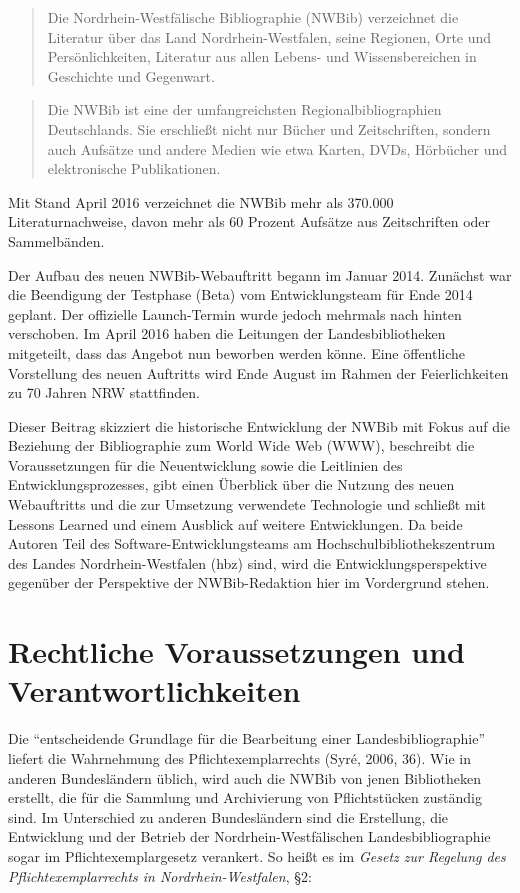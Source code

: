 \documentclass[a4paper,
fontsize=11pt,
oneside,
numbers=noperiodatend,
parskip=half-,
bibliography=totoc,
final
]{scrartcl}
\begin{document}
\begin{quote}
Die Nordrhein-Westfälische Bibliographie (NWBib) verzeichnet die
Literatur über das Land Nordrhein-West\-falen, seine Regionen, Orte und
Persönlichkeiten, Literatur aus allen Lebens- und Wissensbereichen in
Geschichte und Gegenwart.
\end{quote}

\begin{quote}
Die NWBib ist eine der umfangreichsten Regionalbibliographien
Deutschlands. Sie erschließt nicht nur Bücher und Zeitschriften, sondern
auch Aufsätze und andere Medien wie etwa Karten, DVDs, Hörbücher und
elektronische Publikationen.
\end{quote}

Mit Stand April 2016 verzeichnet die NWBib mehr als 370.000
Literaturnachweise, davon mehr als 60 Prozent Aufsätze aus Zeitschriften
oder Sammelbänden.

Der Aufbau des neuen NWBib-Webauftritt begann im Januar 2014. Zunächst
war die Beendigung der Testphase (Beta) vom Entwicklungsteam für Ende
2014 geplant. Der offizielle Launch-Termin wurde jedoch mehrmals nach
hinten verschoben. Im April 2016 haben die Leitungen der
Landesbibliotheken mitgeteilt, dass das Angebot nun beworben werden
könne. Eine öffentliche Vorstellung des neuen Auftritts wird Ende August
im Rahmen der Feierlichkeiten zu 70 Jahren NRW stattfinden.

Dieser Beitrag skizziert die historische Entwicklung der NWBib mit Fokus
auf die Beziehung der Bibliographie zum World Wide Web (WWW), beschreibt
die Voraussetzungen für die Neuentwicklung sowie die Leitlinien des
Entwicklungsprozesses, gibt einen Überblick über die Nutzung des neuen
Webauftritts und die zur Umsetzung verwendete Technologie und schließt
mit Lessons Learned und einem Ausblick auf weitere Entwicklungen. Da
beide Autoren Teil des Software-Entwicklungsteams am
Hochschulbibliothekszentrum des Landes Nordrhein-West\-falen (hbz) sind,
wird die Entwicklungsperspektive gegenüber der Perspektive der
NWBib-Redaktion hier im Vordergrund stehen.

\section*{Rechtliche Voraussetzungen und
Verantwortlichkeiten}\label{rechtliche-voraussetzungen-und-verantwortlichkeiten}

Die \enquote{entscheidende Grundlage für die Bearbeitung einer
Landesbibliographie} liefert die Wahrnehmung des Pflichtexemplarrechts
(Syré, 2006, 36). Wie in anderen Bundesländern üblich, wird auch die
NWBib von jenen Bibliotheken erstellt, die für die Sammlung und
Archivierung von Pflichtstücken zuständig sind. Im Unterschied zu
anderen Bundesländern sind die Erstellung, die Entwicklung und der
Betrieb der Nordrhein-Westfälischen Landesbibliographie sogar im
Pflichtexemplargesetz verankert. So heißt es im \emph{Gesetz zur
Regelung des Pflichtexemplarrechts in Nordrhein-West\-falen}, §2:
\end{document}
